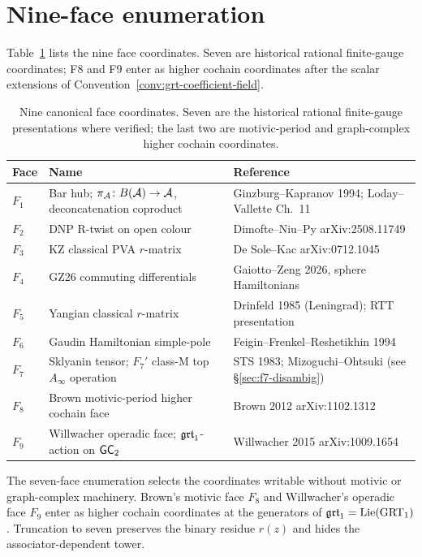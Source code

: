 \section{Nine-face enumeration}
\label{sec:grt-nine}

Table~\ref{tab:nine-faces} lists the nine face coordinates. Seven
are historical rational finite-gauge coordinates; F8 and F9 enter
as higher cochain coordinates after the scalar extensions of
Convention~\ref{conv:grt-coefficient-field}.

\begin{table}[h]
\centering
\begin{tabular}{@{}lll@{}}
\toprule
Face & Name & Reference \\
\midrule
$F_1$ & Bar hub; $\pi_{\mathcal{A}}\colon B(\mathcal{A})\to\mathcal{A}$, deconcatenation coproduct
 & Ginzburg--Kapranov 1994; Loday--Vallette Ch.~11 \\
$F_2$ & DNP R-twist on open colour
 & Dimofte--Niu--Py arXiv:2508.11749 \\
$F_3$ & KZ classical PVA $r$-matrix
 & De Sole--Kac arXiv:0712.1045 \\
$F_4$ & GZ26 commuting differentials
 & Gaiotto--Zeng 2026, sphere Hamiltonians \\
$F_5$ & Yangian classical $r$-matrix
 & Drinfeld 1985 (Leningrad); RTT presentation \\
$F_6$ & Gaudin Hamiltonian simple-pole
 & Feigin--Frenkel--Reshetikhin 1994 \\
$F_7$ & Sklyanin tensor; $F_7'$ class-M top $A_\infty$ operation
 & STS 1983; Mizoguchi--Ohtsuki (see \S\ref{sec:f7-disambig}) \\
$F_8$ & Brown motivic-period higher cochain face
 & Brown 2012 arXiv:1102.1312 \\
$F_9$ & Willwacher operadic face; $\mathfrak{grt}_1$-action on $\mathsf{GC}_2$
 & Willwacher 2015 arXiv:1009.1654 \\
\bottomrule
\end{tabular}
\caption{Nine canonical face coordinates. Seven are the historical
rational finite-gauge presentations where verified; the last two are
motivic-period and graph-complex higher cochain coordinates.}
\label{tab:nine-faces}
\end{table}

\begin{remark}
The seven-face enumeration selects the coordinates writable
without motivic or graph-complex machinery. Brown's motivic face
$F_8$ and Willwacher's operadic face $F_9$ enter as higher cochain
coordinates at the generators of $\mathfrak{grt}_1 = \mathrm{Lie}(\mathrm{GRT}_1)$.
Truncation to seven preserves the binary residue $r(z)$ and hides
the associator-dependent tower.
\end{remark}

